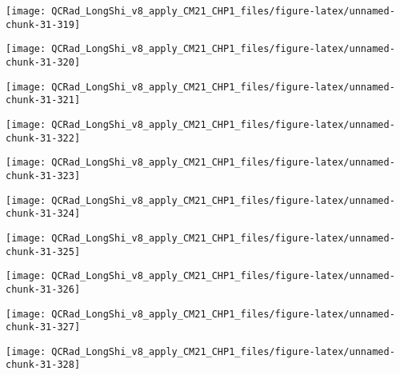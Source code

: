 \documentclass[
  10pt,
  a4paper,oneside]{article}
\begin{document}
\begin{center}\texttt{[image: QCRad\_LongShi\_v8\_apply\_CM21\_CHP1\_files/figure-latex/unnamed-chunk-31-319]} \end{center}

\begin{center}\texttt{[image: QCRad\_LongShi\_v8\_apply\_CM21\_CHP1\_files/figure-latex/unnamed-chunk-31-320]} \end{center}

\begin{center}\texttt{[image: QCRad\_LongShi\_v8\_apply\_CM21\_CHP1\_files/figure-latex/unnamed-chunk-31-321]} \end{center}

\begin{center}\texttt{[image: QCRad\_LongShi\_v8\_apply\_CM21\_CHP1\_files/figure-latex/unnamed-chunk-31-322]} \end{center}

\begin{center}\texttt{[image: QCRad\_LongShi\_v8\_apply\_CM21\_CHP1\_files/figure-latex/unnamed-chunk-31-323]} \end{center}

\begin{center}\texttt{[image: QCRad\_LongShi\_v8\_apply\_CM21\_CHP1\_files/figure-latex/unnamed-chunk-31-324]} \end{center}

\begin{center}\texttt{[image: QCRad\_LongShi\_v8\_apply\_CM21\_CHP1\_files/figure-latex/unnamed-chunk-31-325]} \end{center}

\begin{center}\texttt{[image: QCRad\_LongShi\_v8\_apply\_CM21\_CHP1\_files/figure-latex/unnamed-chunk-31-326]} \end{center}

\begin{center}\texttt{[image: QCRad\_LongShi\_v8\_apply\_CM21\_CHP1\_files/figure-latex/unnamed-chunk-31-327]} \end{center}

\begin{center}\texttt{[image: QCRad\_LongShi\_v8\_apply\_CM21\_CHP1\_files/figure-latex/unnamed-chunk-31-328]} \end{center}
\end{document}

